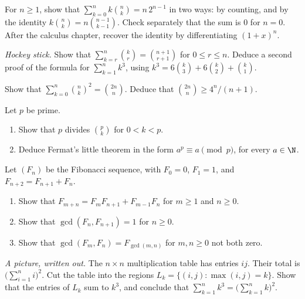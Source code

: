 \begin{exercise}[$\star$]\label{ex:kbinom}
For $n\ge1$, show that $\displaystyle\sum_{k=0}^n k\binom nk=n\,2^{n-1}$ in two ways: by counting, and by the identity $k\binom nk=n\binom{n-1}{k-1}$. Check separately that the sum is $0$ for $n=0$. After the calculus chapter, recover the identity by differentiating $(1+x)^n$.
\end{exercise}

\begin{exercise}[$\star\star$]\label{ex:hockey}
\emph{Hockey stick.} Show that $\displaystyle\sum_{k=r}^n\binom kr=\binom{n+1}{r+1}$ for $0\le r\le n$. Deduce a second proof of the formula for $\sum_{k=1}^n k^3$, using $k^3=6\binom k3+6\binom k2+\binom k1$.
\end{exercise}

\begin{exercise}[$\star\star$]\label{ex:squares}
Show that $\displaystyle\sum_{k=0}^n\binom nk^2=\binom{2n}n$. Deduce that $\binom{2n}n\ge 4^n/(n+1)$.
\end{exercise}

\begin{exercise}[$\star\star$]\label{ex:fermat}
Let $p$ be prime.
\begin{enumerate}[label=(\alph*)]
\item Show that $p$ divides $\binom pk$ for $0<k<p$.
\item Deduce Fermat's little theorem in the form $a^p\equiv a\pmod p$, for every $a\in\N$.
\end{enumerate}
\end{exercise}

\begin{exercise}[$\star\star$]\label{ex:fibgcd}
Let $(F_n)$ be the Fibonacci sequence, with $F_0=0$, $F_1=1$, and $F_{n+2}=F_{n+1}+F_n$.
\begin{enumerate}[label=(\alph*)]
\item Show that $F_{m+n}=F_m F_{n+1}+F_{m-1}F_n$ for $m\ge1$ and $n\ge0$.
\item Show that $\gcd(F_n,F_{n+1})=1$ for $n\ge0$.
\item Show that $\gcd(F_m,F_n)=F_{\gcd(m,n)}$ for $m,n\ge0$ not both zero.
\end{enumerate}
\end{exercise}

\begin{exercise}[$\star\star$]\label{ex:cubesgeo}
\emph{A picture, written out.} The $n\times n$ multiplication table has entries $ij$. Their total is $\bigl(\sum_{i=1}^n i\bigr)^2$. Cut the table into the regions $L_k=\{(i,j):\max(i,j)=k\}$. Show that the entries of $L_k$ sum to $k^3$, and conclude that $\sum_{k=1}^n k^3=\bigl(\sum_{k=1}^n k\bigr)^2$.
\end{exercise}

